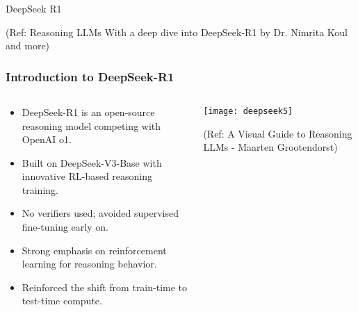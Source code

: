 
\begin{frame}[fragile]\frametitle{}
\begin{center}
{\Large DeepSeek R1}

{\tiny (Ref: Reasoning LLMs With a deep dive into DeepSeek-R1 by Dr. Nimrita Koul and more)}

\end{center}


\end{frame}

\begin{frame}[fragile]\frametitle{Introduction to DeepSeek-R1}
\begin{columns}
    \begin{column}[T]{0.5\linewidth}
      \begin{itemize}
        \item DeepSeek-R1 is an open-source reasoning model competing with OpenAI o1.
        \item Built on DeepSeek-V3-Base with innovative RL-based reasoning training.
        \item No verifiers used; avoided supervised fine-tuning early on.
        \item Strong emphasis on reinforcement learning for reasoning behavior.
        \item Reinforced the shift from train-time to test-time compute.
      \end{itemize}
    \end{column}
    \begin{column}[T]{0.5\linewidth}
        \begin{center}
        \texttt{[image: deepseek5]}
		
		{\tiny (Ref: A Visual Guide to Reasoning LLMs - Maarten Grootendorst)}
		
        \end{center}    
    \end{column}
  \end{columns}
\end{frame}

